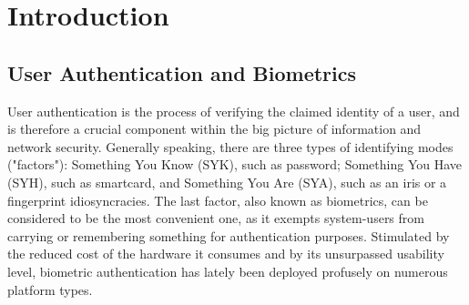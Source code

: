 
\chapter{Introduction}  %

\ifpdf
    \graphicspath{{Chapter1/Figs/Raster/}{Chapter1/Figs/PDF/}{Chapter1/Figs/}}
\else
    \graphicspath{{Chapter1/Figs/Vector/}{Chapter1/Figs/}}
\fi

\section{User Authentication and Biometrics}
\label{sec:biometricIntro}
User authentication is the process of verifying the claimed identity of a user,
and is therefore a crucial component within the big picture of information and
network security. Generally speaking, there are three types of identifying modes
("factors"): Something You Know (SYK), such as password; Something You Have
(SYH), such as smartcard, and Something You Are (SYA), such as an iris or a
fingerprint idiosyncracies. The last factor, also known as biometrics, can be
considered to be the most convenient one, as it exempts system-users from
carrying or remembering something for authentication purposes.  Stimulated by
the reduced cost of the hardware it consumes and by its unsurpassed usability
level, biometric authentication has lately been deployed profusely on numerous
platform types.

